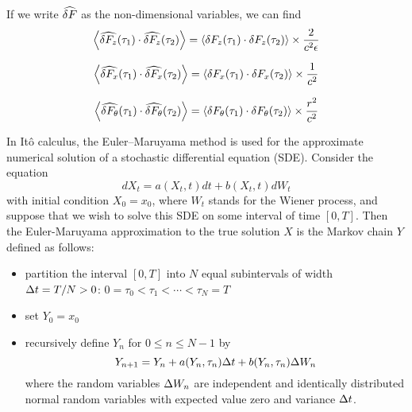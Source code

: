\documentclass[fleqn,10pt]{InternshipReport_SI-ENS-PSL}
\begin{document}

If we write $\widehat{\delta F}$ as the non-dimensional variables, we can find 
$$ \left\langle \widehat{\delta F_{z}}(\tau_1) \cdot \widehat{\delta F_{z}}(\tau_2) \right\rangle = \left\langle \delta F_{z}(\tau_1) \cdot \delta F_{z}(\tau_2) \right\rangle \times \frac{2}{c^2 \epsilon} $$

$$ \left\langle \widehat{\delta F_{x}}(\tau_1) \cdot \widehat{\delta F_{x}}(\tau_2) \right\rangle = \left\langle \delta F_{x}(\tau_1) \cdot \delta F_{x}(\tau_2) \right\rangle \times \frac{1}{c^2} $$

$$ \left\langle \widehat{\delta F_{\theta}}(\tau_1) \cdot \widehat{\delta F_{\theta}}(\tau_2) \right\rangle = \left\langle \delta F_{\theta}(\tau_1) \cdot \delta F_{\theta}(\tau_2) \right\rangle \times \frac{r^2}{c^2} $$




In Itô calculus, the Euler–Maruyama method is used for the approximate numerical solution of a stochastic differential equation (SDE). 
Consider the equation 
$$ dX_t = a(X_t,t) dt + b(X_t,t) dW_t $$
with initial condition $X_0 = x_0$, where $W_t$ stands for the Wiener process, and suppose that we wish to solve this SDE on some interval of time $[0, T]$. Then the Euler-Maruyama approximation to the true solution $X$ is the Markov chain $Y$ defined as follows:
\begin{itemize}[noitemsep]
	\item partition the interval $[0,T]$ into $N$ equal subintervals of width $\Delta t = T/N > 0$:
	$ 0 = \tau_0 < \tau_1 < \cdots < \tau_N = T $
	\item set $Y_0 = x_0$
	\item recursively define $Y_n$ for $0 \leqslant n \leqslant N-1$ by
	$$ Y_{n+1} = Y_n + a(Y_n,\tau_n) \Delta t + b(Y_n,\tau_n) \Delta W_n $$
	where the random variables $\Delta W_n$ are independent and identically distributed normal random variables with expected value zero and variance $\Delta t$.
\end{itemize}


\end{document}
